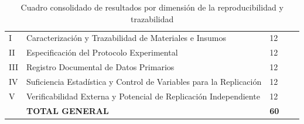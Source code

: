 \begin{table}[htbp]
\centering
\scriptsize
\caption{Cuadro consolidado de resultados por dimensión de la reproducibilidad y trazabilidad}\label{tab:consolidado-reproducibilidad}
\begin{tabularx}{\textwidth}{|C{0.8cm}|L{7.5cm}|C{1.8cm}|C{1.8cm}|X|}
\hline
{}
 &  &  &  &  \\ \hline
I & Caracterización y Trazabilidad de Materiales e Insumos & 12 & & \\ \hline
{}
II & Especificación del Protocolo Experimental & 12 & & \\ \hline
III & Registro Documental de Datos Primarios & 12 & & \\ \hline
{}
IV & Suficiencia Estadística y Control de Variables para la Replicación & 12 & & \\ \hline
V & Verificabilidad Externa y Potencial de Replicación Independiente & 12 & & \\ \hline
{}
& \textbf{TOTAL GENERAL} & \textbf{60} & & \\ \hline
\end{tabularx}
\normalsize
\end{table}

